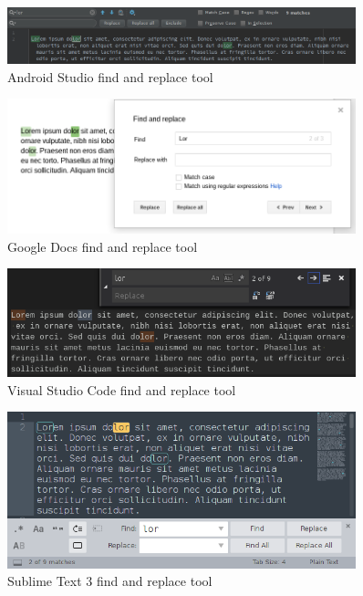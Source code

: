 \documentclass[bsc,frontabs,twoside,singlespacing,parskip,deptreport]{infthesis}
\begin{document}
\begin{figure}[hp]
\centering
\includegraphics[width=0.9\textwidth]{../docs/editor-find-and-replace/android-studio-find-and-replace.png}
\caption{Android Studio find and replace tool}
\end{figure}

\begin{figure}[hp]
\centering
\includegraphics[width=0.9\textwidth]{../docs/editor-find-and-replace/gdocs-find-and-replace.png}
\caption{Google Docs find and replace tool}
\end{figure}

\begin{figure}[hp]
\centering
\includegraphics[width=0.9\textwidth]{../docs/editor-find-and-replace/vscode-find-and-replace.png}
\caption{Visual Studio Code find and replace tool}
\end{figure}

\begin{figure}[hp]
\centering
\includegraphics[width=0.9\textwidth]{../docs/editor-find-and-replace/sublime-find-and-replace.png}
\caption{Sublime Text 3 find and replace tool}
\end{figure}
\end{document}
